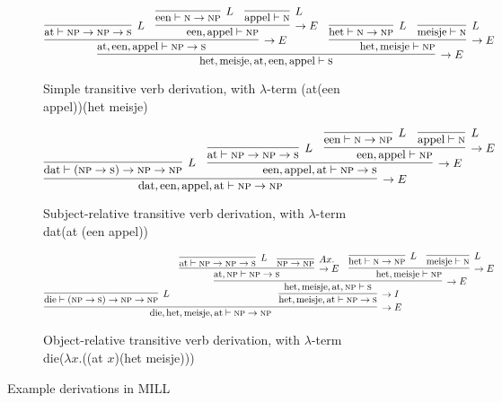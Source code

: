 \begin{figure}
	\begin{subfigure}[b]{1\textwidth}
	\centering
	\small
		\[
		\infer[\rightarrow E]{\text{het}, \text{meisje}, \text{at}, \text{een}, \text{appel} \vdash \textsc{s}}{
			\infer[\rightarrow E]{\text{at}, \text{een}, \text{appel} \vdash \textsc{np} \to \textsc{s}}{
				\infer[L]{\text{at} \vdash \textsc{np} \to \textsc{np} \to \textsc{s}}{}
				&
				\infer[\rightarrow E]{\text{een}, \text{appel} \vdash \textsc{np}}{
					\infer[L]{\text{een} \vdash \textsc{n} \to \textsc{np}}{}
					&
					\infer[L]{\text{appel} \vdash \textsc{n}}{}
				}
			}
			&		
			\infer[\rightarrow E]{\text{het}, \text{meisje} \vdash \textsc{np}}{
				\infer[L]{\text{het} \vdash \textsc{n} \to \textsc{np}}{}
				&
				\infer[L]{\text{meisje} \vdash \textsc{n}}{}
			}
		}
		\]
		\caption{Simple transitive verb derivation, with $\lambda$-term (at(een appel))(het meisje)}
		\end{subfigure}
		\begin{subfigure}[b]{1\textwidth}
		\centering
		\scriptsize
		\[
		\infer[\rightarrow E]{\text{dat}, \text{een}, \text{appel}, \text{at} \vdash \textsc{np} \to \textsc{np}}{
			\infer[L]{\text{dat} \vdash (\textsc{np} \to \textsc{s}) \to \textsc{np} \to \textsc{np}}{}
			&
			\infer[\rightarrow E]{\text{een}, \text{appel}, \text{at} \vdash \textsc{np} \to \textsc{s}}{
				\infer[L]{\text{at} \vdash \textsc{np} \to \textsc{np} \to \textsc{s}}{}
				&
				\infer[\rightarrow E]{\text{een}, \text{appel} \vdash \textsc{np}}{
					\infer[L]{\text{een} \vdash \textsc{n} \to \textsc{np}}{}
					&
					\infer[L]{\text{appel} \vdash \textsc{n}}{}
				}
			}
		}
		\]
		\caption{Subject-relative transitive verb derivation, with $\lambda$-term dat(at (een appel))}
		\label{subfig:ill_dutch:sub}
		\end{subfigure}
		\begin{subfigure}[b]{1\textwidth}
		\centering
		\scriptsize
		\[
		\infer[\rightarrow E]{\text{die}, \text{het}, \text{meisje}, \text{at} \vdash \textsc{np} \to \textsc{np}}{
			\infer[L]{\text{die} \vdash (\textsc{np} \to \textsc{s})\to \textsc{np} \to \textsc{np}}{}
			&
			\infer[\rightarrow I]{\text{het}, \text{meisje}, \text{at} \vdash \textsc{np} \to \textsc{s}}{
				\infer[\rightarrow E]{\text{het}, \text{meisje}, \text{at}, \textsc{np} \vdash \textsc{s}}{
					\infer[\rightarrow E]{\text{at}, \textsc{np}\vdash \textsc{np} \to \textsc{s}}{
						\infer[L]{\text{at} \vdash \textsc{np} \to \textsc{np} \to \textsc{s}}{}
						&
						\infer[Ax.]{\textsc{np} \to \textsc{np}}{}
					}
					&
					\infer[\rightarrow E]{\text{het}, \text{meisje} \vdash \textsc{np}}{
						\infer[L]{\text{het} \vdash \textsc{n} \to \textsc{np}}{}
						&
						\infer[L]{\text{meisje} \vdash \textsc{n}}{}					
					}
				}
			}
		}
		\]
		\caption{Object-relative transitive verb derivation, with $\lambda$-term die($\lambda x$.((at $x$)(het meisje)))}
		\label{subfig:ill_dutch:obj}
		\end{subfigure}
\caption[Example MILL Derivations]{Example derivations in MILL}
\label{fig:ill_dutch}
\end{figure}

